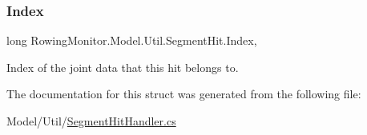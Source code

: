 \subsubsection{\texorpdfstring{Index}{Index}}
{\footnotesize\ttfamily long Rowing\+Monitor.\+Model.\+Util.\+Segment\+Hit.\+Index\hspace{0.3cm}{\ttfamily [get]}, {\ttfamily [set]}}



Index of the joint data that this hit belongs to. 



The documentation for this struct was generated from the following file\+:\begin{DoxyCompactItemize}
\item 
Model/\+Util/\hyperlink{_segment_hit_handler_8cs}{Segment\+Hit\+Handler.\+cs}\end{DoxyCompactItemize}
